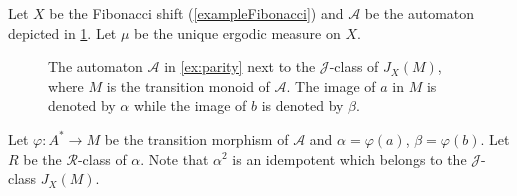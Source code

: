 \documentclass[a4paper,UKenglish,numberwithinsect,cleveref]{lipics-v2021}
\newcommand{\drawgrid}[3]{
            \foreach \i in {2,...,#1}
                \draw (#3-\i-1.north west) to (#3-\i-#1.north east);
            \foreach \i in {2,...,#2}
                \draw (#3-1-\i.north west) to (#3-#2-\i.south west);
            }
\newcommand{\JJ}{\mathrel{\mathscr{J}}}
\newcommand{\RR}{\mathrel{\mathscr{R}}}
\newcommand{\A}{\mathcal A}
\newcommand*{\from}{\colon}
\begin{document}
\begin{example}\label{ex:parity}
    Let $X$ be the Fibonacci shift (\cref{exampleFibonacci}) and $\A$ be the automaton
    depicted in \cref{figureJClass}. Let $\mu$ be the unique ergodic measure on $X$.
    \begin{figure}
      \centering
        \quad
        \caption{The automaton $\A$ in \cref{ex:parity} next to the $\JJ$-class of $J_X(M)$, where $M$ is the transition monoid of $\A$. The image of $a$ in $M$ is denoted by $\alpha$ while the image of $b$ is denoted by $\beta$.}\label{figureJClass}
    \end{figure}
    Let $\varphi\from A^*\to M$ be the transition morphism of $\A$ and
    $\alpha=\varphi(a)$, $\beta=\varphi(b)$. Let $R$ be the $\RR$-class of $\alpha$. Note that $\alpha^2$ is an idempotent which belongs to the $\JJ$-class $J_X(M)$. 


\end{example}
\end{document}
